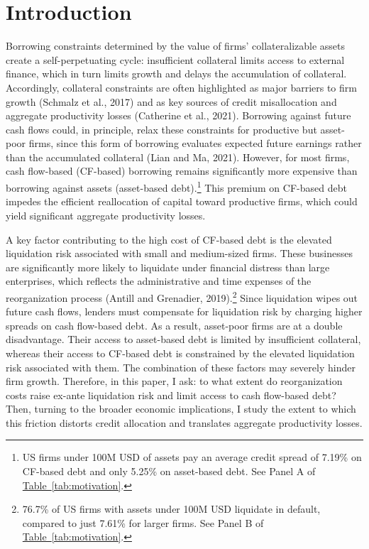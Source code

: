 \documentclass[12pt]{article}
\begin{document}
\section{Introduction \label{sec:introduction}} 

Borrowing constraints determined by the value of firms' collateralizable assets create a self-perpetuating cycle: insufficient collateral limits access to external finance, which in turn limits growth and delays the accumulation of collateral. Accordingly, collateral constraints are often highlighted as major barriers to firm growth (Schmalz et al., 2017) and as key sources of credit misallocation and aggregate productivity losses (Catherine et al., 2021). Borrowing against future cash flows could, in principle, relax these constraints for productive but asset-poor firms, since this form of borrowing evaluates expected future earnings rather than the accumulated collateral (Lian and Ma, 2021). However, for most firms, cash flow-based (CF-based) borrowing remains significantly more expensive than borrowing against assets (asset-based debt).\footnote{US firms under 100M USD of assets pay an average credit spread of 7.19\% on CF-based debt and only 5.25\% on asset-based debt. See Panel A of \hyperref[tab:motivation]{{Table~\ref*{tab:motivation}}}.} This premium on CF-based debt impedes the efficient reallocation of capital toward productive firms, which could yield significant aggregate productivity losses.

A key factor contributing to the high cost of CF-based debt is the elevated liquidation risk associated with small and medium-sized firms. These businesses are significantly more likely to liquidate under financial distress than large enterprises, which reflects the administrative and time expenses of the reorganization process (Antill and Grenadier, 2019).\footnote{76.7\% of US firms with assets under 100M USD liquidate in default, compared to just 7.61\% for larger firms. See Panel B of \hyperref[tab:motivation]{{Table~\ref*{tab:motivation}}}.} Since liquidation wipes out future cash flows, lenders must compensate for liquidation risk by charging higher spreads on cash flow-based debt. As a result, asset-poor firms are at a double disadvantage. Their access to asset-based debt is limited by insufficient collateral, whereas their access to CF-based debt is constrained by the elevated liquidation risk associated with them. The combination of these factors may severely hinder firm growth. Therefore, in this paper, I ask: to what extent do reorganization costs raise ex-ante liquidation risk and limit access to cash flow-based debt? Then, turning to the broader economic implications, I study the extent to which this friction distorts credit allocation and translates aggregate productivity losses.
\end{document}
